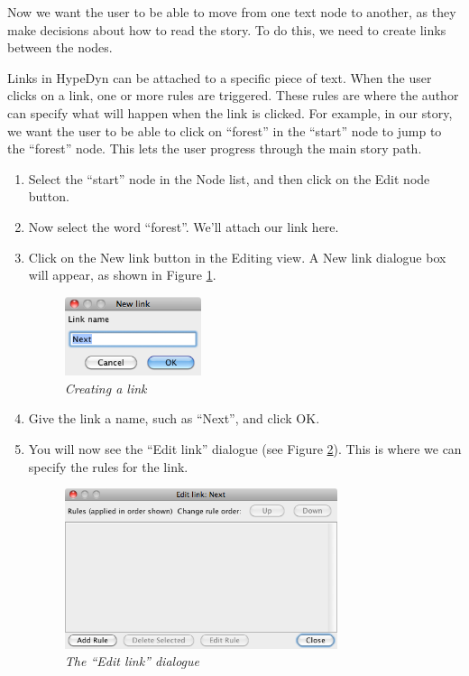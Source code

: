 \documentclass{article}
\begin{document}
Now we want the user to be able to move from one text node to another, as they
make decisions about how to read the story. To do this, we need to create links
between the nodes.

Links in HypeDyn can be attached to a specific piece of text. When the user
clicks on a link, one or more rules are triggered. These rules are where the
author can specify what will happen when the link is clicked. For example, in our
story, we want the user to be able to click on ``forest'' in the ``start'' node
to jump to the ``forest'' node. This lets the user progress through the main
story path.

\begin{enumerate}
  \item Select the ``start'' node in the Node list, and then click on the Edit
  node button.
  \item Now select the word ``forest''. We'll attach our link here.
  \item Click on the New link button in the Editing view. A New link dialogue
  box will appear, as shown in Figure \ref{fig:create_link}.

\begin{figure}[ht]
  \centering
  \includegraphics[width=4cm]{images/hypedyn-tutorial-1-figure-7}
  \caption{\textit{Creating a link}}
  \label{fig:create_link}
\end{figure} 

\item Give the link a name, such as ``Next'', and click OK. \item You will now
see the ``Edit link'' dialogue (see Figure \ref{fig:edit_link_1}). This is where
we can specify the rules for the link.

\begin{figure}[ht]
  \centering
  \includegraphics[width=8cm]{images/hypedyn-tutorial-1-figure-8}
  \caption{\textit{The ``Edit link'' dialogue}}
  \label{fig:edit_link_1}
\end{figure} 


\end{enumerate}
\end{document}

